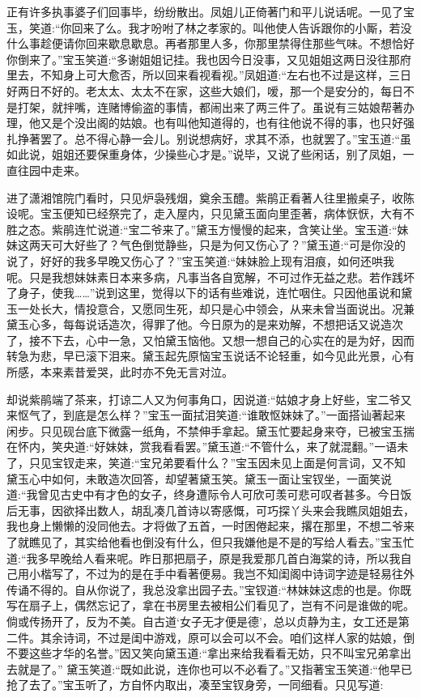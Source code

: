 \begin{parag}
    正有许多执事婆子们回事毕，纷纷散出。凤姐儿正倚著门和平儿说话呢。一见了宝玉，笑道:“你回来了么。我才吩咐了林之孝家的。叫他使人告诉跟你的小厮，若没什么事趁便请你回来歇息歇息。再者那里人多，你那里禁得住那些气味。不想恰好你倒来了。”宝玉笑道:“多谢姐姐记挂。我也因今日没事，又见姐姐这两日没往那府里去，不知身上可大愈否，所以回来看视看视。”凤姐道:“左右也不过是这样，三日好两日不好的。老太太、太太不在家，这些大娘们，嗳，那一个是安分的，每日不是打架，就拌嘴，连赌博偷盗的事情，都闹出来了两三件了。虽说有三姑娘帮著办理，他又是个没出阁的姑娘。也有叫他知道得的，也有往他说不得的事，也只好强扎挣著罢了。总不得心静一会儿。别说想病好，求其不添，也就罢了。”宝玉道:“虽如此说，姐姐还要保重身体，少操些心才是。”说毕，又说了些闲话，别了凤姐，一直往园中走来。
\end{parag}


\begin{parag}
    进了潇湘馆院门看时，只见炉袅残烟，奠余玉醴。紫鹃正看著人往里搬桌子，收陈设呢。宝玉便知已经祭完了，走入屋内，只见黛玉面向里歪著，病体恹恹，大有不胜之态。紫鹃连忙说道:“宝二爷来了。”黛玉方慢慢的起来，含笑让坐。宝玉道:“妹妹这两天可大好些了？气色倒觉静些，只是为何又伤心了？”黛玉道:“可是你没的说了，好好的我多早晚又伤心了？”宝玉笑道:“妹妹脸上现有泪痕，如何还哄我呢。只是我想妹妹素日本来多病，凡事当各自宽解，不可过作无益之悲。若作践坏了身子，使我……”说到这里，觉得以下的话有些难说，连忙咽住。只因他虽说和黛玉一处长大，情投意合，又愿同生死，却只是心中领会，从来未曾当面说出。况兼黛玉心多，每每说话造次，得罪了他。今日原为的是来劝解，不想把话又说造次了，接不下去，心中一急，又怕黛玉恼他。又想一想自己的心实在的是为好，因而转急为悲，早已滚下泪来。黛玉起先原恼宝玉说话不论轻重，如今见此光景，心有所感，本来素昔爱哭，此时亦不免无言对泣。
\end{parag}


\begin{parag}
    却说紫鹃端了茶来，打谅二人又为何事角口，因说道:“姑娘才身上好些，宝二爷又来怄气了，到底是怎么样？”宝玉一面拭泪笑道:“谁敢怄妹妹了。”一面搭讪著起来闲步。只见砚台底下微露一纸角，不禁伸手拿起。黛玉忙要起身来夺，已被宝玉揣在怀内，笑央道:“好妹妹，赏我看看罢。”黛玉道:“不管什么，来了就混翻。”一语未了，只见宝钗走来，笑道:“宝兄弟要看什么？”宝玉因未见上面是何言词，又不知黛玉心中如何，未敢造次回答，却望著黛玉笑。黛玉一面让宝钗坐，一面笑说道:“我曾见古史中有才色的女子，终身遭际令人可欣可羡可悲可叹者甚多。今日饭后无事，因欲择出数人，胡乱凑几首诗以寄感慨，可巧探丫头来会我瞧凤姐姐去，我也身上懒懒的没同他去。才将做了五首，一时困倦起来，撂在那里，不想二爷来了就瞧见了，其实给他看也倒没有什么，但只我嫌他是不是的写给人看去。”宝玉忙道:“我多早晚给人看来呢。昨日那把扇子，原是我爱那几首白海棠的诗，所以我自己用小楷写了，不过为的是在手中看著便易。我岂不知闺阁中诗词字迹是轻易往外传诵不得的。自从你说了，我总没拿出园子去。”宝钗道:“林妹妹这虑的也是。你既写在扇子上，偶然忘记了，拿在书房里去被相公们看见了，岂有不问是谁做的呢。倘或传扬开了，反为不美。自古道‘女子无才便是德’，总以贞静为主，女工还是第二件。其余诗词，不过是闺中游戏，原可以会可以不会。咱们这样人家的姑娘，倒不要这些才华的名誉。”因又笑向黛玉道:“拿出来给我看看无妨，只不叫宝兄弟拿出去就是了。” 黛玉笑道:“既如此说，连你也可以不必看了。”又指著宝玉笑道:“他早已抢了去了。”宝玉听了，方自怀内取出，凑至宝钗身旁，一同细看。只见写道:
\end{parag}



